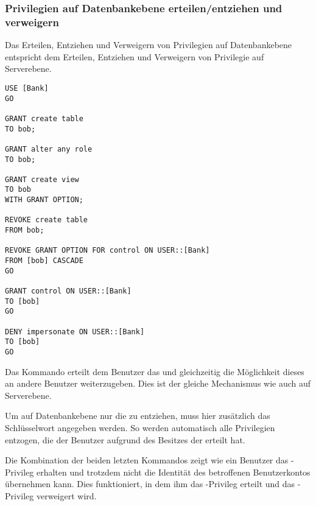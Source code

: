         \subsubsection{Privilegien auf Datenbankebene erteilen/entziehen
        und verweigern}
          Das Erteilen, Entziehen und Verweigern von Privilegien auf
          Datenbankebene entspricht dem Erteilen, Entziehen und Verweigern von
          Privilegie auf Serverebene.
          
          \begin{lstlisting}[language=ms_sql, caption={Privilegien auf
          Datenbankebene erteilen, entziehen und verweigern},label=admin19_17]
USE [Bank]
GO

GRANT create table 
TO bob;

GRANT alter any role 
TO bob;

GRANT create view 
TO bob
WITH GRANT OPTION;

REVOKE create table 
FROM bob;

REVOKE GRANT OPTION FOR control ON USER::[Bank] 
FROM [bob] CASCADE
GO

GRANT control ON USER::[Bank] 
TO [bob]
GO

DENY impersonate ON USER::[Bank] 
TO [bob]
GO
          \end{lstlisting}
          Das Kommando  erteilt dem Benutzer  das  und gleichzeitig die Möglichkeit dieses an andere Benutzer
          weiterzugeben. Dies ist der gleiche Mechanismus wie auch auf
          Serverebene.
          
          Um auf Datenbankebene nur die  zu
          entziehen, muss hier zusätzlich das Schlüsselwort
           angegeben werden. So werden automatisch alle
          Privilegien entzogen, die der Benutzer aufgrund des Besitzes der
           erteilt hat.
          
          Die Kombination der beiden letzten Kommandos zeigt wie ein Benutzer
          das -Privileg erhalten und trotzdem nicht die
          Identität des betroffenen Benutzerkontos übernehmen kann. Dies
          funktioniert, in dem ihm das -Privileg erteilt und
          das -Privileg verweigert wird.
          \begin{literaturinternet}
            \item \cite{ms188396}
            \item \cite{ms187728}
          \end{literaturinternet}
